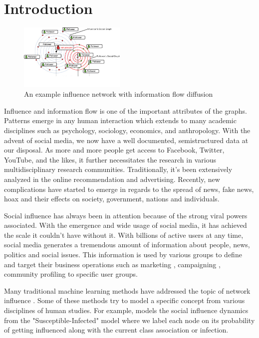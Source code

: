 \section{Introduction}

\begin{figure}
\includegraphics[width=2in]{images/influence_net.jpg}
\caption{An example influence network with information flow diffusion}
\end{figure}

Influence and information flow is one of the important attributes of the graphs. Patterns emerge in any human interaction which extends to many academic disciplines such as psychology, sociology, economics, and anthropology. With the advent of social media, we now have a well documented, semistructured data at our disposal. As more and more people get access to Facebook, Twitter, YouTube, and the likes, it further necessitates the research in various multidisciplinary research communities. Traditionally, it's been extensively analyzed in the online recommendation and advertising. Recently, new complications have started to emerge in regards to the spread of news, fake news, hoax and their effects on society, government, nations and individuals.

Social influence has always been in attention because of the strong viral powers associated. With the emergence and wide usage of social media, it has achieved the scale it couldn't have without it. With billions of active users at any time, social media generates a tremendous amount of information about people, news, politics and social issues. This information is used by various groups to define and target their business operations such as marketing \cite{hoffman2010can}, campaigning \cite{cogburn2011networked, ratkiewicz2011detecting, shirky2011political, tumasjan2010predicting}, community profiling \cite{papadopoulos2012community, zhou2012community, chandrasekaran2013social} to specific user groups.

Many traditional machine learning methods have addressed the topic of network influence \cite{kempe2003maximizing, abebe2018opinion, albi2017opinion, acemoglu2011opinion, lawyer2015understanding, harada2015forecasting, islamdeepdiffuse}. Some of these methods try to model a specific concept from various disciplines of human studies. For example, \cite{matsubara2012rise} models the social influence dynamics from the "Susceptible-Infected" model where we label each node on its probability of getting influenced along with the current class association or infection. 

